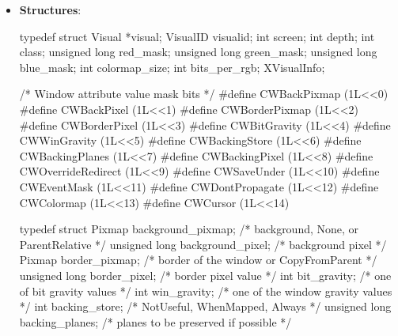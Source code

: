 \documentclass{report}
\begin{document}
\begin{itemize}
    \end{itemize}




    \pagebreak 
    \begin{itemize}
        \item \textbf{Structures}:
            \begin{cppcode}
                typedef struct {
                    Visual *visual;
                    VisualID visualid;
                    int screen;
                    int depth;
                    int class;
                    unsigned long red_mask;
                    unsigned long green_mask;
                    unsigned long blue_mask;
                    int colormap_size;
                    int bits_per_rgb;
                } XVisualInfo;
            \end{cppcode}
            \begin{cppcode}
                /* Window attribute value mask bits */
                #define CWBackPixmap        (1L<<0)
                #define CWBackPixel         (1L<<1)
                #define CWBorderPixmap      (1L<<2)
                #define CWBorderPixel       (1L<<3)
                #define CWBitGravity        (1L<<4)
                #define CWWinGravity        (1L<<5)
                #define CWBackingStore      (1L<<6)
                #define CWBackingPlanes     (1L<<7)
                #define CWBackingPixel      (1L<<8)
                #define CWOverrideRedirect  (1L<<9)
                #define CWSaveUnder         (1L<<10)
                #define CWEventMask         (1L<<11)
                #define CWDontPropagate     (1L<<12)
                #define CWColormap          (1L<<13)
                #define CWCursor            (1L<<14)
            \end{cppcode}
            \begin{cppcode}
                typedef struct {
                    Pixmap background_pixmap;       /* background, None, or ParentRelative */
                    unsigned long background_pixel; /* background pixel */
                    Pixmap border_pixmap;           /* border of the window or CopyFromParent */
                    unsigned long border_pixel;     /* border pixel value */
                    int bit_gravity;                /* one of bit gravity values */
                    int win_gravity;                /* one of the window gravity values */
                    int backing_store;              /* NotUseful, WhenMapped, Always */
                    unsigned long backing_planes;   /* planes to be preserved if possible */
}
\end{cppcode}
\end{itemize}
\end{document}
